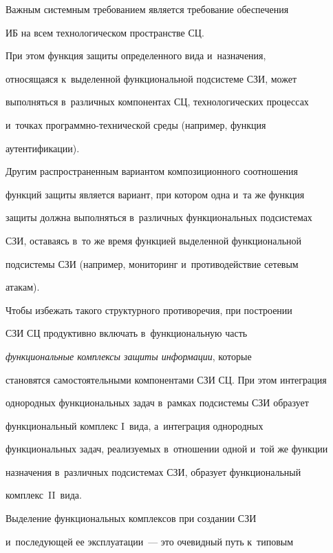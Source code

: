     

    Важным системным требованием является требование обеспечения 

ИБ на всем технологическом пространстве СЦ.


    При этом функция защиты определенного вида и~назначения, 

относящаяся к~выделенной функциональной под\-сис\-те\-ме СЗИ, может 

выполняться в~различных компонентах СЦ, технологических процессах 

и~точках про\-граммно-тех\-ни\-че\-ской среды (например, функция 

аутентификации).

    

    Другим распространенным вариантом композиционного соотношения 

функций защиты является вариант, при котором одна и~та же функция 

защиты должна выполняться в~различных функциональных под\-сис\-те\-мах 

СЗИ, оставаясь в~то же время функцией выделенной функциональной 

под\-сис\-те\-мы СЗИ (например, мониторинг и~противодействие сетевым 

атакам).

    

    Чтобы избежать такого структурного противоречия, при построении 

СЗИ СЦ продуктивно включать в~функциональную часть 

\textit{функциональные комплексы защиты информации}, которые 

становятся самостоятельными компонентами СЗИ СЦ. При этом интеграция 

однородных функциональных задач в~рамках под\-сис\-те\-мы СЗИ образует 

функциональный комплекс I~вида, а~интеграция однородных 

функциональных задач, реализуемых в~отношении одной и~той же функции 

назначения в~различных под\-сис\-те\-мах СЗИ, образует функциональный 

комплекс~II~вида.

    

    Выделение функциональных комплексов при создании СЗИ 

и~последующей ее эксплуатации~--- это очевидный путь к~типовым 

